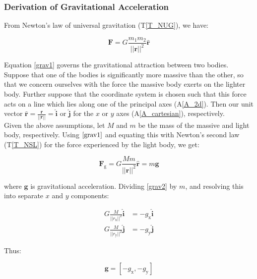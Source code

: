 \documentclass[12pt]{article}
\newcommand{\aref}[1]{A\ref{#1}}
\begin{document}

\subsubsection*{Derivation of Gravitational Acceleration}

From Newton's law of universal gravitation (T\ref{T_NUG}), we have:

\begin{equation}
\mathbf{F} = G\frac{m_1m_2}{||\mathbf{r}||^2}\mathbf{\hat{r}} \label{grav1}
\end{equation}

\noindent 
Equation \ref{grav1} governs the gravitational attraction between two bodies. Suppose that one of the bodies is significantly more massive than the other, so that we concern ourselves with the force the massive body exerts on the lighter body. Further suppose that the coordinate system is chosen such that this force acts on a line which lies along one of the principal axes (\aref{A_2d}). Then our unit vector $\mathbf{\hat{r}} = \frac{\mathbf{r}}{||\mathbf{r}||} = \mathbf{\hat{i}}$ or $\mathbf{\hat{j}}$ for the $x$ or $y$ axes (\aref{A_cartesian}), respectively. \\
\newline
Given the above assumptions, let $M$ and $m$ be the mass of the massive and light body, respectively. Using $\ref{grav1}$ and equating this with Newton's second law (T\ref{T_NSL}) for the force experienced by the light body, we get:

\begin{equation}
\mathbf{F}_\mathrm{g} = G\frac{Mm}{||\mathbf{r}||^2}\mathbf{\hat{r}} = m\mathbf{g} \label{grav2}
\end{equation}

\noindent
where $\mathbf{g}$ is gravitational acceleration. Dividing \ref{grav2} by $m$, and resolving this into separate $x$ and $y$ components:

\begin{equation*}
\begin{aligned}
G\frac{M}{||r_\mathrm{x}||^2}\mathbf{\hat{i}} & = -g_\mathrm{x}\mathbf{\hat{i}} \\
G\frac{M}{||r_\mathrm{y}||^2}\mathbf{\hat{j}} & = -g_\mathrm{y}\mathbf{\hat{j}} 
\end{aligned}
\end{equation*}

\noindent
Thus:

\begin{equation*}
\mathbf{g} = [-g_\mathrm{x}, -g_\mathrm{y}]
\end{equation*}
\end{document}
